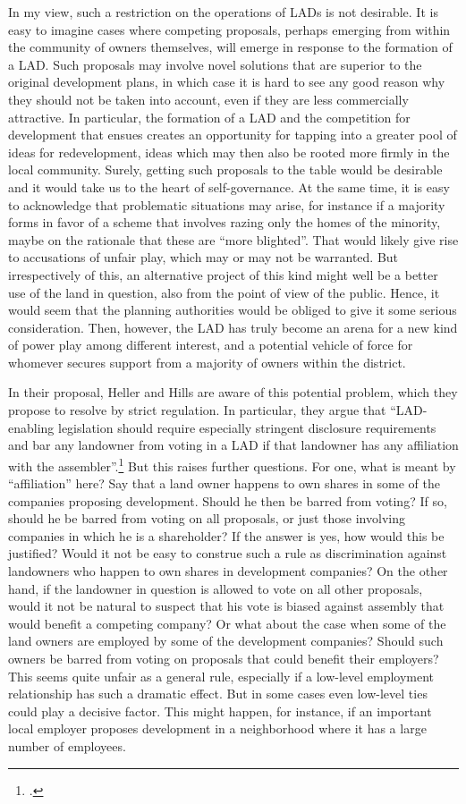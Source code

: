 In my view, such a restriction on the operations of LADs is not desirable. It is easy to imagine cases where competing proposals, perhaps emerging from within the community of owners themselves, will emerge in response to the formation of a LAD. Such proposals may involve novel solutions that are superior to the original development plans, in which case it is hard to see any good reason why they should not be taken into account, even if they are less commercially attractive. In particular, the formation of a LAD and the competition for development that ensues creates an opportunity for tapping into a greater pool of ideas for redevelopment, ideas which may then also be rooted more firmly in the local community. Surely, getting such proposals to the table would be desirable and it would take us to the heart of self-governance. At the same time, it is easy to acknowledge that problematic situations may arise, for instance if a majority forms in favor of a scheme that involves razing only the homes of the minority, maybe on the rationale that these are ``more blighted''. That would likely give rise to accusations of unfair play, which may or may not be warranted. But irrespectively of this, an alternative project of this kind might well be a better use of the land in question, also from the point of view of the public. Hence, it would seem that the planning authorities would be obliged to give it some serious consideration. Then, however, the LAD has truly become an arena for a new kind of power play among different interest, and a potential vehicle of force for whomever secures support from a majority of owners within the district.

In their proposal, Heller and Hills are aware of this potential problem, which they propose to resolve by strict regulation. In particular, they argue that ``LAD-enabling legislation should require especially stringent disclosure requirements and bar any landowner from voting in a LAD if that landowner has any affiliation with the assembler''.\footcite{heller08} But this raises further questions. For one, what is meant by ``affiliation'' here? Say that a land owner happens to own shares in some of the companies proposing development. Should he then be barred from voting? If so, should he be barred from voting on all proposals, or just those involving companies in which he is a shareholder? If the answer is yes, how would this be justified? Would it not be easy to construe such a rule as discrimination against landowners who happen to own shares in development companies? On the other hand, if the landowner in question is allowed to vote on all other proposals, would it not be natural to suspect that his vote is biased against assembly that would benefit a competing company? Or what about the case when some of the land owners are employed by some of the development companies? Should such owners be barred from voting on proposals that could benefit their employers? This seems quite unfair as a general rule, especially if a low-level employment relationship has such a dramatic effect. But in some cases even low-level ties could play a decisive factor. This might happen, for instance, if an important local employer proposes development in a neighborhood where it has a large number of employees.


